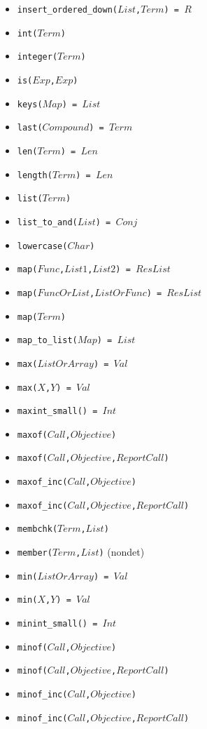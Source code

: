 \documentclass[10pt]{article}
\begin{document}
\begin{multicols}{2}
\begin{scriptsize}
\begin{itemize}
    \item \texttt{insert\_ordered\_down($List$,$Term$) = $R$} 
    \item \texttt{int($Term$)} 
    \item \texttt{integer($Term$)} 
    \item \texttt{is($Exp$,$Exp$)} 
    \item \texttt{keys($Map$) = $List$} 
    \item \texttt{last($Compound$) = $Term$} 
    \item \texttt{len($Term$) = $Len$} 
    \item \texttt{length($Term$) = $Len$} 
    \item \texttt{list($Term$)} 
    \item \texttt{list\_to\_and($List$) = $Conj$}
    \item \texttt{lowercase($Char$)} 
    \item \texttt{map($Func$,$List1$,$List2$) = $ResList$} 
    \item \texttt{map($FuncOrList$,$ListOrFunc$) = $ResList$} 
    \item \texttt{map($Term$)} 
    \item \texttt{map\_to\_list($Map$) = $List$} 
    \item \texttt{max($ListOrArray$) = $Val$} 
    \item \texttt{max($X$,$Y$) = $Val$} 
    \item \texttt{maxint\_small() = $Int$}
    \item \texttt{maxof($Call$,$Objective$)} 
    \item \texttt{maxof($Call$,$Objective$,$ReportCall$)} 
    \item \texttt{maxof\_inc($Call$,$Objective$)} 
    \item \texttt{maxof\_inc($Call$,$Objective$,$ReportCall$)} 
    \item \texttt{membchk($Term$,$List$)} 
    \item \texttt{member($Term$,$List$)} (nondet)
    \item \texttt{min($ListOrArray$) = $Val$} 
    \item \texttt{min($X$,$Y$) = $Val$} 
    \item \texttt{minint\_small() = $Int$}
    \item \texttt{minof($Call$,$Objective$)} 
    \item \texttt{minof($Call$,$Objective$,$ReportCall$)} 
    \item \texttt{minof\_inc($Call$,$Objective$)} 
    \item \texttt{minof\_inc($Call$,$Objective$,$ReportCall$)} 

\end{itemize}
\end{scriptsize}
\end{multicols}
\end{document}
